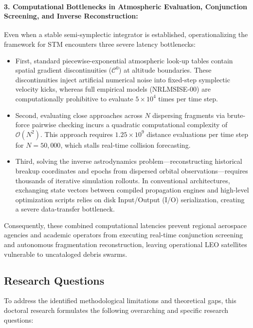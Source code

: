 \paragraph{3. Computational Bottlenecks in Atmospheric Evaluation, Conjunction Screening, and Inverse Reconstruction:}
Even when a stable semi-symplectic integrator is established, operationalizing the framework for STM encounters three severe latency bottlenecks:
\begin{itemize}
    \item First, standard piecewise-exponential atmospheric look-up tables contain spatial gradient discontinuities ($\mathcal{C}^0$) at altitude boundaries. These discontinuities inject artificial numerical noise into fixed-step symplectic velocity kicks, whereas full empirical models (NRLMSISE-00) are computationally prohibitive to evaluate $5 \times 10^4$ times per time step.
    \item Second, evaluating close approaches across $N$ dispersing fragments via brute-force pairwise checking incurs a quadratic computational complexity of $\mathcal{O}(N^2)$. This approach requires $1.25 \times 10^9$ distance evaluations per time step for $N = 50,000$, which stalls real-time collision forecasting.
    \item Third, solving the inverse astrodynamics problem---reconstructing historical breakup coordinates and epochs from dispersed orbital observations---requires thousands of iterative simulation rollouts. In conventional architectures, exchanging state vectors between compiled propagation engines and high-level optimization scripts relies on disk Input/Output (I/O) serialization, creating a severe data-transfer bottleneck.
\end{itemize}
Consequently, these combined computational latencies prevent regional aerospace agencies and academic operators from executing real-time conjunction screening and autonomous fragmentation reconstruction, leaving operational LEO satellites vulnerable to uncataloged debris swarms.

\subsection{Research Questions}
\label{subsec:research_questions}

To address the identified methodological limitations and theoretical gaps, this doctoral research formulates the following overarching and specific research questions:

